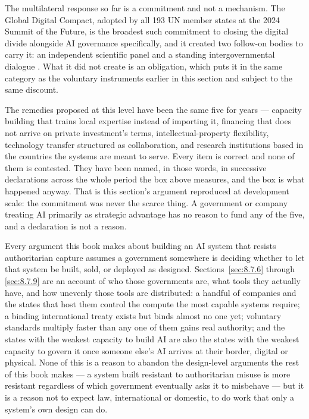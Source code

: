The multilateral response so far is a commitment and not a mechanism. The Global Digital Compact, adopted by all 193 UN member states at the 2024 Summit of the Future, is the broadest such commitment to closing the digital divide alongside AI governance specifically, and it created two follow-on bodies to carry it: an independent scientific panel and a standing intergovernmental dialogue \autocite{un2024globaldigitalcompact}. What it did not create is an obligation, which puts it in the same category as the voluntary instruments earlier in this section and subject to the same discount.

The remedies proposed at this level have been the same five for years — capacity building that trains local expertise instead of importing it, financing that does not arrive on private investment's terms, intellectual-property flexibility, technology transfer structured as collaboration, and research institutions based in the countries the systems are meant to serve. Every item is correct and none of them is contested. They have been named, in those words, in successive declarations across the whole period the box above measures, and the box is what happened anyway. That is this section's argument reproduced at development scale: the commitment was never the scarce thing. A government or company treating AI primarily as strategic advantage has no reason to fund any of the five, and a declaration is not a reason.

Every argument this book makes about building an AI system that resists authoritarian capture assumes a government somewhere is deciding whether to let that system be built, sold, or deployed as designed. Sections~\ref{sec:8.7.6} through \ref{sec:8.7.9} are an account of who those governments are, what tools they actually have, and how unevenly those tools are distributed: a handful of companies and the states that host them control the compute the most capable systems require; a binding international treaty exists but binds almost no one yet; voluntary standards multiply faster than any one of them gains real authority; and the states with the weakest capacity to build AI are also the states with the weakest capacity to govern it once someone else's AI arrives at their border, digital or physical. None of this is a reason to abandon the design-level arguments the rest of this book makes — a system built resistant to authoritarian misuse is more resistant regardless of which government eventually asks it to misbehave — but it is a reason not to expect law, international or domestic, to do work that only a system's own design can do.
